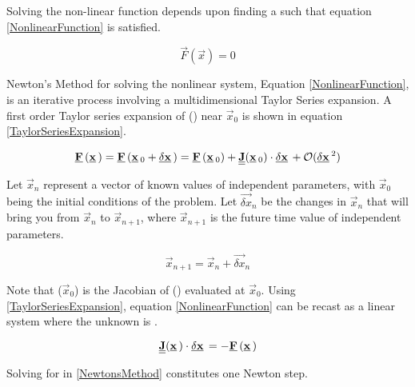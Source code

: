 Solving the non-linear function depends upon finding a  such that equation \eqref{NonlinearFunction} is satisfied.

\begin{equation}
\label{NonlinearFunction}
\Vec{F}(\Vec{x}) = 0
\end{equation}


Newton's Method for solving the nonlinear system, Equation \eqref{NonlinearFunction}, is an iterative process involving a multidimensional Taylor Series expansion.
A first order Taylor series expansion of () near $\Vec{x}_0$ is shown in equation \eqref{TaylorSeriesExpansion}.

\begin{equation}
\label{TaylorSeriesExpansion}
\Vec{F}(\Vec{x}) = \Vec{F}(\Vec{x}_0+\Vec{\delta x})= \Vec{F}(\Vec{x}_0)+\Mat{J}(\Vec{x}_0)\cdot\Vec{\delta x}+\mathcal{O}(\Vec{\delta x}^2)
\end{equation}

Let $\Vec{x}_n$ represent a vector of known values of independent parameters, with $\Vec{x}_0$ being the initial conditions of the problem.
Let $\Vec{\delta x}_n$ be the changes in $\Vec{x}_n$ that will bring you from $\Vec{x}_n$ to $\Vec{x}_{n+1}$, where $\Vec{x}_{n+1}$ is the future time value of independent parameters.

\begin{equation}
\label{DeltaX}
\Vec{x}_{n+1} = \Vec{x}_n + \Vec{\delta x}_n
\end{equation}

Note that ($\Vec{x}_0$) is the Jacobian of () evaluated at $\Vec{x}_0$. 
Using \eqref{TaylorSeriesExpansion}, equation \eqref{NonlinearFunction} can be recast as a linear system where the unknown is .

\begin{equation}
\label{NewtonsMethod}
\Mat{J}(\Vec{x})\cdot\Vec{\delta x} = -\Vec{F}(\Vec{x})
\end{equation}

Solving for  in \eqref{NewtonsMethod} constitutes one Newton step.

